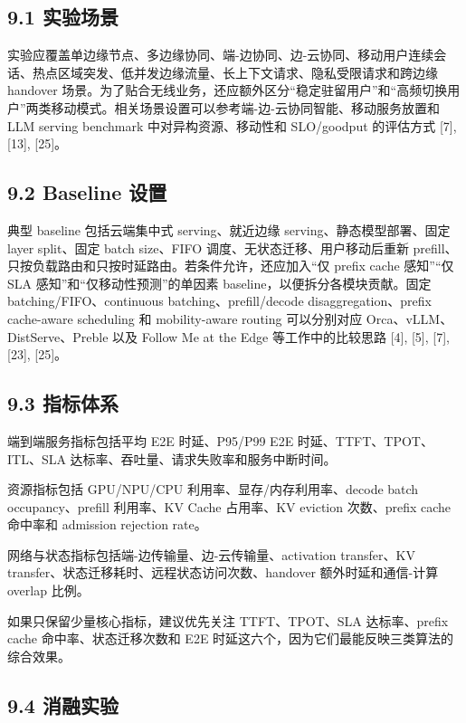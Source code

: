 \documentclass[a4paper,10pt]{ctexart}
\begin{document}
\subsection*{9.1 实验场景}

实验应覆盖单边缘节点、多边缘协同、端-边协同、边-云协同、移动用户连续会话、热点区域突发、低并发边缘流量、长上下文请求、隐私受限请求和跨边缘 handover 场景。为了贴合无线业务，还应额外区分“稳定驻留用户”和“高频切换用户”两类移动模式。相关场景设置可以参考端-边-云协同智能、移动服务放置和 LLM serving benchmark 中对异构资源、移动性和 SLO/goodput 的评估方式 [7], [13], [25]。


\subsection*{9.2 Baseline 设置}

典型 baseline 包括云端集中式 serving、就近边缘 serving、静态模型部署、固定 layer split、固定 batch size、FIFO 调度、无状态迁移、用户移动后重新 prefill、只按负载路由和只按时延路由。若条件允许，还应加入“仅 prefix cache 感知”“仅 SLA 感知”和“仅移动性预测”的单因素 baseline，以便拆分各模块贡献。固定 batching/FIFO、continuous batching、prefill/decode disaggregation、prefix cache-aware scheduling 和 mobility-aware routing 可以分别对应 Orca、vLLM、DistServe、Preble 以及 Follow Me at the Edge 等工作中的比较思路 [4], [5], [7], [23], [25]。


\subsection*{9.3 指标体系}

端到端服务指标包括平均 E2E 时延、P95/P99 E2E 时延、TTFT、TPOT、ITL、SLA 达标率、吞吐量、请求失败率和服务中断时间。


资源指标包括 GPU/NPU/CPU 利用率、显存/内存利用率、decode batch occupancy、prefill 利用率、KV Cache 占用率、KV eviction 次数、prefix cache 命中率和 admission rejection rate。


网络与状态指标包括端-边传输量、边-云传输量、activation transfer、KV transfer、状态迁移耗时、远程状态访问次数、handover 额外时延和通信-计算 overlap 比例。


如果只保留少量核心指标，建议优先关注 TTFT、TPOT、SLA 达标率、prefix cache 命中率、状态迁移次数和 E2E 时延这六个，因为它们最能反映三类算法的综合效果。


\subsection*{9.4 消融实验}
\end{document}
